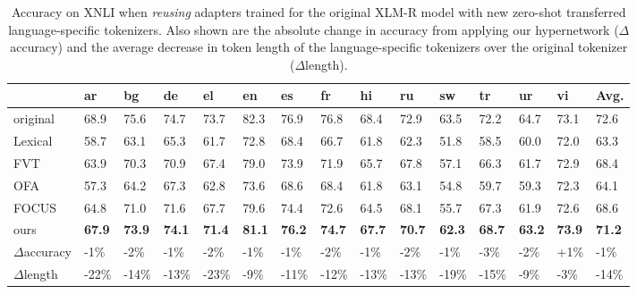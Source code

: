 
\begin{table}[t]
\caption{Accuracy on XNLI when \textit{reusing} adapters trained for the original XLM-R model with new zero-shot transferred language-specific tokenizers. Also shown are the absolute change in accuracy from applying our hypernetwork ($\Delta$accuracy) and the average decrease in token length of the language-specific tokenizers over the original tokenizer ($\Delta$length).}
\centering
\small
\setlength\tabcolsep{0.1pt}
\begin{tabularx}{\linewidth}{lRRRRRRRRRRRRRR}
\toprule
 & \textbf{ar} & \textbf{bg} & \textbf{de} & \textbf{el} & \textbf{en} & \textbf{es} & \textbf{fr} & \textbf{hi} & \textbf{ru} & \textbf{sw} & \textbf{tr} & \textbf{ur} & \textbf{vi} & \textbf{Avg.} \\
\midrule
{} original & 68.9 & 75.6 & 74.7 & 73.7 & 82.3 & 76.9 & 76.8 & 68.4 & 72.9 & 63.5 & 72.2 & 64.7 & 73.1 & 72.6\\
\midrule
Lexical & 58.7 & 63.1 & 65.3 & 61.7 & 72.8 & 68.4 & 66.7 & 61.8 & 62.3 & 51.8 & 58.5 & 60.0 & 72.0 & 63.3\\
FVT & 63.9 & 70.3 & 70.9 & 67.4 & 79.0 & 73.9 & 71.9 & 65.7 & 67.8 & 57.1 & 66.3 & 61.7 & 72.9 & 68.4 \\
OFA & 57.3 & 64.2 & 67.3 & 62.8 & 73.6 & 68.6 & 68.4 & 61.8 & 63.1 & 54.8 & 59.7 & 59.3 & 72.3 & 64.1 \\
FOCUS & 64.8 & 71.0 & 71.6 & 67.7 & 79.6 & 74.4 & 72.6 & 64.5 & 68.1 & 55.7 & 67.3 & 61.9 & 72.6 & 68.6 \\
ours & \textbf{67.9} & \textbf{73.9} & \textbf{74.1} & \textbf{71.4} & \textbf{81.1} & \textbf{76.2} & \textbf{74.7} & \textbf{67.7} & \textbf{70.7} & \textbf{62.3} & \textbf{68.7} & \textbf{63.2} & \textbf{73.9} & \textbf{71.2} \\
\midrule
$\Delta$accuracy & \textcolor{BrickRed}{-1\%} & \textcolor{BrickRed}{-2\%} &  \textcolor{BrickRed}{-1\%} & \textcolor{BrickRed}{-2\%} & \textcolor{BrickRed}{-1\%} & \textcolor{BrickRed}{-1\%} & \textcolor{BrickRed}{-2\%} & \textcolor{BrickRed}{-1\%} & \textcolor{BrickRed}{-2\%} & \textcolor{BrickRed}{-1\%} & \textcolor{BrickRed}{-3\%} & \textcolor{BrickRed}{-2\%} & \textcolor{JungleGreen}{+1\%} & \textcolor{BrickRed}{-1\%} \\
$\Delta$length & \textcolor{JungleGreen}{-22\%} & \textcolor{JungleGreen}{-14\%} & \textcolor{JungleGreen}{-13\%} & \textcolor{JungleGreen}{-23\%} & \textcolor{JungleGreen}{-9\%} & \textcolor{JungleGreen}{-11\%} & \textcolor{JungleGreen}{-12\%} & \textcolor{JungleGreen}{-13\%} & \textcolor{JungleGreen}{-13\%} & \textcolor{JungleGreen}{-19\%} & \textcolor{JungleGreen}{-15\%} & \textcolor{JungleGreen}{-9\%} & \textcolor{JungleGreen}{-3\%} & \textcolor{JungleGreen}{-14\%} \\
\bottomrule
\end{tabularx}
\label{table:encoder}
\vspace{-0.3cm}
\end{table}
